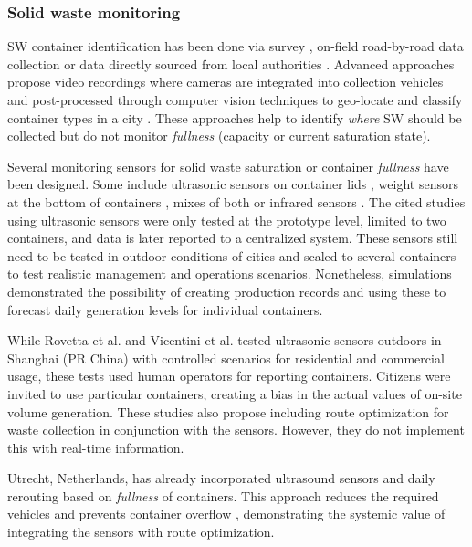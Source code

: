 \documentclass[authoryear,preprint,review,11pt,doubleblind]{elsarticle}
\begin{document}
    \subsubsection{Solid waste monitoring}
    \label{subsubsec:Monitoring}
    SW container identification has been done via survey \citep{alsobkySmartFramework23}, on-field road-by-road data collection \citep{ kiranCharacterizationQuantification23} or data directly sourced from local authorities \citep{Hina2020}. Advanced approaches propose video recordings where cameras are integrated into collection vehicles and post-processed through computer vision techniques to geo-locate and classify container types in a city \citep{Moral2022}. These approaches help to identify \textit{where} SW should be collected but do not monitor \textit{fullness} (capacity or current saturation state).
    
    Several monitoring sensors for solid waste saturation or container \textit{fullness} have been designed. Some include ultrasonic sensors on container lids \citep{Chaudhari2018, Joshi2022, Karthik2021, Mahajan2017, Ramson2017}, weight sensors at the bottom of containers \citep{Rovetta2009}, mixes of both \citep{Ali2020, Vicentini2009} or infrared sensors \citep{Singh2016}. The cited studies using ultrasonic sensors were only tested at the prototype level, limited to two containers, and data is later reported to a centralized system. These sensors still need to be tested in outdoor conditions of cities and scaled to several containers to test realistic management and operations scenarios. Nonetheless, \citet{Ali2020} simulations demonstrated the possibility of creating production records and using these to forecast daily generation levels for individual containers.

    While Rovetta et al. and Vicentini et al. tested ultrasonic sensors outdoors in Shanghai (PR China) with controlled scenarios for residential and commercial usage, these tests used human operators for reporting containers. Citizens were invited to use particular containers, creating a bias in the actual values of on-site volume generation. These studies also propose including route optimization for waste collection in conjunction with the sensors. However, they do not implement this with real-time information.

   Utrecht, Netherlands, has already incorporated ultrasound sensors and daily rerouting based on \textit{fullness} of containers. This approach reduces the required vehicles and prevents container overflow \citep{utrechtUndergroundContainersMunicipality2021}, demonstrating the systemic value of integrating the sensors with route optimization.
\end{document}
